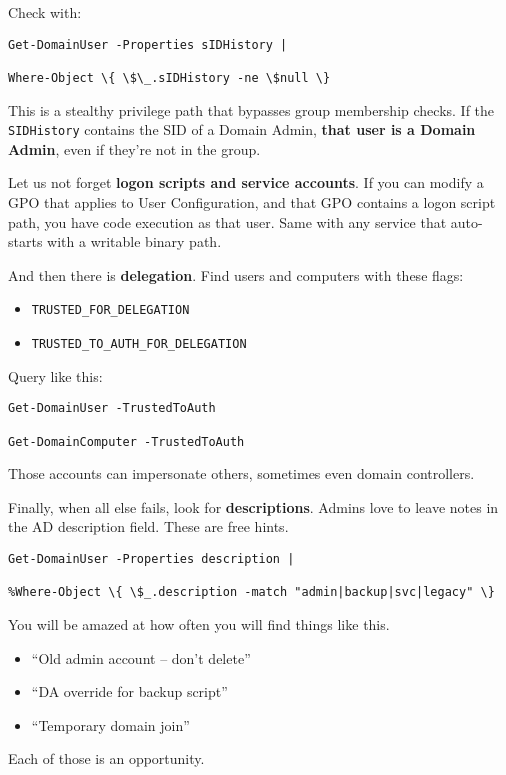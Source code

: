 Check with:
\begin{verbatim}
Get-DomainUser -Properties sIDHistory |

Where-Object \{ \$\_.sIDHistory -ne \$null \}
\end{verbatim}
This is a stealthy privilege path that bypasses group membership checks. If the \texttt{SIDHistory} contains the SID of a Domain Admin, \textbf{that user is a Domain Admin}, even if they’re not in the group.

Let us not forget \textbf{ logon scripts and service accounts}. If you can modify a GPO that applies to User Configuration, and that GPO contains a logon script path, you have code execution as that user. Same with any service that auto-starts with a writable binary path.

And then there is \textbf{ delegation}. Find users and computers with these flags:

\begin{itemize}
    \item \texttt{TRUSTED\_FOR\_DELEGATION}
    \item \texttt{TRUSTED\_TO\_AUTH\_FOR\_DELEGATION}

\end{itemize}

Query like this:
\begin{verbatim}
Get-DomainUser -TrustedToAuth

Get-DomainComputer -TrustedToAuth
\end{verbatim}
Those accounts can impersonate others, sometimes even domain controllers.

Finally, when all else fails, look for \textbf{descriptions}. Admins love to leave notes in the AD description field. These are free hints.
\begin{verbatim}
Get-DomainUser -Properties description |

%Where-Object \{ \$_.description -match "admin|backup|svc|legacy" \}
\end{verbatim}
You will be amazed at how often you will find things like this.

\begin{itemize}
    \item “Old admin account – don’t delete”
    \item “DA override for backup script”
    \item “Temporary domain join”


\end{itemize}
Each of those is an opportunity.

